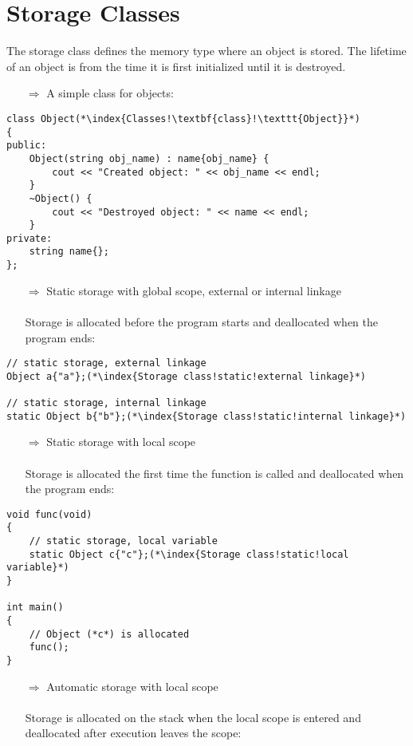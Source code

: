 \documentclass[10pt]{book}
\begin{document}
\section{Storage Classes}
The storage class defines the memory type where an object is stored. The lifetime of an object is from the time it is first initialized until it is destroyed.
\begin{enumerate}
\item[$\Rightarrow$] A simple class for objects:
\end{enumerate}
\begin{lstlisting}
class Object(*\index{Classes!\textbf{class}!\texttt{Object}}*)
{
public:
    Object(string obj_name) : name{obj_name} {
        cout << "Created object: " << obj_name << endl;
    }
    ~Object() { 
        cout << "Destroyed object: " << name << endl;
    }
private:
    string name{};
};
\end{lstlisting}
\begin{enumerate}
\item[$\Rightarrow$] Static storage with global scope, external or internal linkage\\ \\ Storage is allocated before the program starts and deallocated when the program ends:
\end{enumerate}
\begin{lstlisting}
// static storage, external linkage
Object a{"a"};(*\index{Storage class!static!external linkage}*)

// static storage, internal linkage
static Object b{"b"};(*\index{Storage class!static!internal linkage}*)
\end{lstlisting}
\begin{enumerate}
\item[$\Rightarrow$] Static storage with local scope\\ \\ Storage is allocated the first time the function is called and deallocated when the program ends:
\end{enumerate}
\begin{lstlisting}
void func(void)
{
    // static storage, local variable
    static Object c{"c"};(*\index{Storage class!static!local variable}*)
}

int main()
{
    // Object (*c*) is allocated
    func();
}
\end{lstlisting}
\begin{enumerate}
\item[$\Rightarrow$] Automatic storage with local scope\\ \\ Storage is allocated on the stack when the local scope is entered and deallocated after execution leaves the scope:
\end{enumerate}
\end{document}
